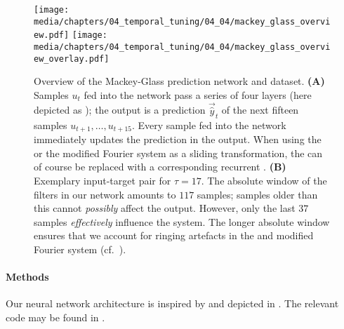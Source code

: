 \begin{figure}
	\texttt{[image: media/chapters/04\_temporal\_tuning/04\_04/mackey\_glass\_overview.pdf]}%
	\kern-158mm\texttt{[image: media/chapters/04\_temporal\_tuning/04\_04/mackey\_glass\_overview\_overlay.pdf]}\\[0.25cm]
	{\label{fig:mackey_glass_overview_overlay_a}}%
	{\label{fig:mackey_glass_overview_overlay_b}}%
	\caption[Overview of the Mackey-Glass prediction network and dataset]{
		Overview of the Mackey-Glass prediction network and dataset.
		\textbf{(A)} Samples $u_t$ fed into the network pass a series of four \LMU layers (here depicted as \FIR \LMUpl); the output is a prediction $\vec{\hat y}_t$ of the next fifteen samples $u_{t + 1}, \ldots, u_{t + 15}$.
		Every sample fed into the network immediately updates the prediction in the output.
		When using the \LDN or the modified Fourier system as a sliding transformation, the \FIR \LMUpl can of course be replaced with a corresponding recurrent \LRGF \LMU.
		\textbf{(B)} Exemplary input-target pair for $\tau = 17$.
		The absolute window of the \FIR filters in our network amounts to $117$ samples; samples older than this cannot \emph{possibly} affect the output. However, only the last $37$ samples \emph{effectively} influence the system.
		The longer absolute window ensures that we account for ringing artefacts in the \LDN and modified Fourier system (cf.~).
	}
\end{figure}

\paragraph{Methods}
Our neural network architecture is inspired by \citet{voelker2019lmu} and depicted in .
The relevant code may be found in .


